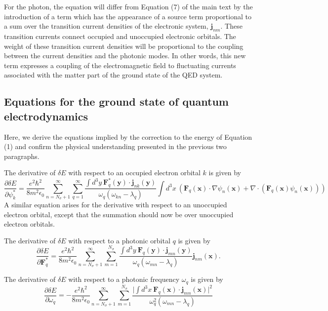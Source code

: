 \documentclass[aps,prb,onecolumn,preprint,
	groupedaddress,superscriptaddress,
	amsfonts,amssymb,amsmath,floatfix,
	citeautoscript]{revtex4-1}
\begin{document}
For the photon, the equation will differ from Equation (7) of the main text by the introduction of a term which has the appearance of a source term proportional to a sum over the transition current densities of the electronic system, $\mathbf{j}_{nm}$. These transition currents connect occupied and unoccupied electronic orbitals. The weight of these transition current densities will be proportional to the coupling between the current densities and the photonic modes. In other words, this new term expresses a coupling of the electromagnetic field to fluctuating currents associated with the matter part of the ground state of the QED system. 

\subsection{Equations for the ground state of quantum electrodynamics}

Here, we derive the equations implied by the correction to the energy of Equation (1) and confirm the physical understanding presented in the previous two paragraphs.

The derivative of $\delta E$ with respect to an occupied electron orbital $k$ is given by
\begin{equation}
\frac{\partial\delta E}{\partial \psi_k^*} = \frac{e^2\hbar^2}{8m^2\epsilon_0}\sum\limits_{n=N_{\sigma}+1}^{\infty}\sum\limits_{q=1}^{\infty} \frac{\int d^3y~\mathbf{F}^*_q(\mathbf{y})\cdot\mathbf{j}_{nk}(\mathbf{y})}{\omega_q(\omega_{kn}-\lambda_q)}\int d^3x~\left( \mathbf{F}_q(\mathbf{x})\cdot\nabla\psi_n(\mathbf{x}) + \nabla\cdot(\mathbf{F}_q(\mathbf{x})\psi_n(\mathbf{x}))\right)
\end{equation}
A similar equation arises for the derivative with respect to an unoccupied electron orbital, except that the summation should now be over unoccupied electron orbitals.

The derivative of $\delta E$ with respect to a photonic orbital $q$ is given by
\begin{equation}
\frac{\partial\delta E}{\partial \mathbf{F}_q^*}=\frac{e^2\hbar^2}{8m^2\epsilon_0}\sum\limits_{n=N_{\sigma}+1}^{\infty}\sum\limits_{m=1}^{N_{\sigma}} \frac{\int d^3y~\mathbf{F}_q(\mathbf{y})\cdot \mathbf{j}_{mn}(\mathbf{y})}{\omega_q(\omega_{mn}-\lambda_q)}\mathbf{j}_{nm}(\mathbf{x}).
\end{equation}

The derivative of $\delta E$ with respect to a photonic frequency $\omega_q$ is given by
\begin{equation}
\frac{\partial\delta E}{\partial\omega_q}=-\frac{e^2\hbar^2}{8m^2\epsilon_0}\sum\limits_{n=N_{\sigma}+1}^{\infty}\sum\limits_{m=1}^{N_{\sigma}}\frac{\Big|\int d^3x~\mathbf{F}_q(\mathbf{x})\cdot\mathbf{j}_{mn}(\mathbf{x})\Big|^2}{\omega_q^2(\omega_{mn}-\lambda_q)}
\end{equation}
\end{document}
